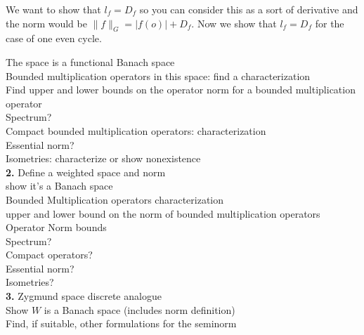 \documentclass[11 pt]{report}
\begin{document}
\indent \indent We want to show that $l_f = D_f$ so you can consider this as a sort of derivative and the norm would be $\|f\|_G=|f(o)|+D_f$. Now we show that $l_f = D_f$ for the case of one even cycle. 

\indent The space is a functional Banach space\\

\indent Bounded multiplication operators in this space: find a characterization\\

\indent Find upper and lower bounds on the operator norm for a bounded multiplication operator\\

\indent Spectrum?\\

\indent Compact bounded multiplication operators: characterization\\

\indent Essential norm?\\

\indent Isometries: characterize or show nonexistence\\

\textbf{2.} Define a weighted space and norm\\

\indent show it's a Banach space\\

\indent Bounded Multiplication operators characterization\\

\indent upper and lower bound on the norm of bounded multiplication operators\\

\indent Operator Norm bounds\\

\indent Spectrum?\\

\indent Compact operators?\\

\indent Essential norm?\\

\indent Isometries?\\

\textbf{3.} Zygmund space discrete analogue\\

\indent Show $W$ is a Banach space (includes norm definition)\\

\indent Find, if suitable, other formulations for the seminorm\\
\end{document}
